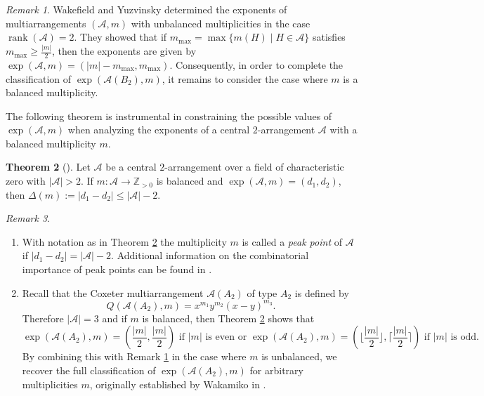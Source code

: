 \documentclass[12pt]{amsart}
\theoremstyle{definition}
\newtheorem{theorem}{Theorem}[section]
\theoremstyle{remark}
\newtheorem{remark}[theorem]{Remark}
\newcommand{\rank}{\operatorname{rank}}
\newcommand\CA{{\mathscr A}}
\newcommand\ZZ{{\mathbb Z}}
\begin{document}
\begin{remark}\label{Remark: Unbalanced m exponents}
Wakefield and Yuzvinsky \cite{MR2309190} determined the exponents of multiarrangements $(\CA,m)$ with unbalanced multiplicities in the case $\rank(\CA)=2$. They showed that if $m_{\max}=\max\{m(H)\mid H\in \CA\}$ satisfies $m_{\max}\geq\frac{\vert m\vert}{2}$, then the exponents are given by $\exp(\CA,m)=(\vert m\vert -m_{\max}, m_{\max})$. 
Consequently, in order to complete the classification of $\exp(\CA(B_2),m)$, it remains to consider the case where $m$ is a balanced multiplicity. 
\end{remark}

The following theorem is instrumental in constraining the possible values of $\exp(\CA, m)$ when analyzing the exponents of a central $2$-arrangement $\CA$ with a balanced multiplicity $m$.

\begin{theorem}[{\cite[Thm.~1.6]{MR3070120}}]\label{theorem: peak points}
    Let $\CA$ be a central $2$-arrangement over a field of characteristic zero with $\vert\CA\vert>2$. If $m:\CA\to\ZZ_{>0}$ is balanced and $\exp(\CA,m)=(d_1,d_2)$, then $\Delta(m):=\vert d_1-d_2\vert\leq \vert\CA\vert-2$.
\end{theorem}

\begin{remark}\label{Remark: peak points and A2 classification}
    \begin{enumerate}
        \item With notation as in Theorem \ref{theorem: peak points} the multiplicity $m$ is called a \emph{peak point} of $\CA$ if $\vert d_1-d_2\vert=\vert\CA\vert-2$. Additional information on the combinatorial importance of peak points can be found in \cite{MR2873095}.
        \item Recall that the Coxeter multiarrangement $\CA(A_2)$ of type $A_2$ is defined by $$Q(\CA(A_2),m)=x^{m_1}y^{m_2}(x-y)^{m_3}.$$ Therefore $\vert \CA\vert=3$ and if $m$ is balanced, then Theorem \ref{theorem: peak points} shows that $$\exp(\CA(A_2),m)=(\frac{\vert m\vert}{2},\frac{\vert m\vert}{2})\text{ if }\vert m\vert\text{ is even or }\exp(\CA(A_2),m)=(\lfloor\frac{\vert m\vert}{2}\rfloor,\lceil\frac{\vert m\vert}{2}\rceil)\text{ if }\vert m\vert\text{ is odd.}$$
        By combining this with Remark \ref{Remark: Unbalanced m exponents} in the case where $m$ is unbalanced, we recover the full classification of $\exp(\CA(A_2),m)$ for arbitrary multiplicities $m$, originally established by Wakamiko in \cite{MR2328057}.
    \end{enumerate}
\end{remark}
\end{document}
